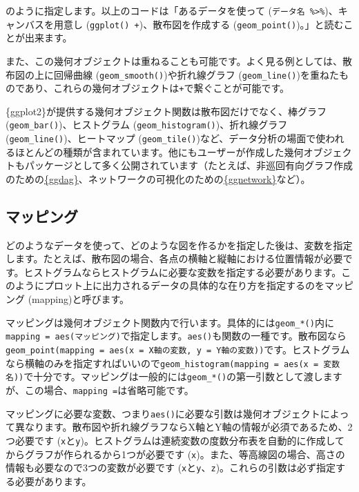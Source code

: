 \documentclass[
  a4paper,
  pandoc,
  ja=standard,
  jafont=haranoaji]{bxjsbook}
\begin{document}
のように指定します。以上のコードは「あるデータを使って
(\texttt{データ名\ \%\textgreater{}\%})、キャンバスを用意し
(\texttt{ggplot()\ +})、散布図を作成する
(\texttt{geom\_point()})。」と読むことが出来ます。

また、この幾何オブジェクトは重ねることも可能です。よく見る例としては、散布図の上に回帰曲線
(\texttt{geom\_smooth()})や折れ線グラフ
(\texttt{geom\_line()})を重ねたものであり、これらの幾何オブジェクトは\texttt{+}で繋ぐことが可能です。

\{ggplot2\}が提供する幾何オブジェクト関数は散布図だけでなく、棒グラフ
(\texttt{geom\_bar()})、ヒストグラム
(\texttt{geom\_histogram()})、折れ線グラフ
(\texttt{geom\_line()})、ヒートマップ
(\texttt{geom\_tile()})など、データ分析の場面で使われるほとんどの種類が含まれています。他にもユーザーが作成した幾何オブジェクトもパッケージとして多く公開されています（たとえば、非巡回有向グラフ作成のための\href{https://cran.r-project.org/web/packages/ggdag/index.html}{\{ggdag\}}、ネットワークの可視化のための\href{https://cran.r-project.org/web/packages/ggnetwork/index.html}{\{ggnetwork\}}など）。

\hypertarget{ux30deux30c3ux30d4ux30f3ux30b0}{%
\subsection{マッピング}\label{ux30deux30c3ux30d4ux30f3ux30b0}}

どのようなデータを使って、どのような図を作るかを指定した後は、変数を指定します。たとえば、散布図の場合、各点の横軸と縦軸における位置情報が必要です。ヒストグラムならヒストグラムに必要な変数を指定する必要があります。このようにプロット上に出力されるデータの具体的な在り方を指定するのをマッピング
(mapping)と呼びます。

マッピングは幾何オブジェクト関数内で行います。具体的には\texttt{geom\_*()}内に\texttt{mapping\ =\ aes(マッピング)}で指定します。\texttt{aes()}も関数の一種です。散布図なら\texttt{geom\_point(mapping\ =\ aes(x\ =\ X軸の変数,\ y\ =\ Y軸の変数))}です。ヒストグラムなら横軸のみを指定すればいいので\texttt{geom\_histogram(mapping\ =\ aes(x\ =\ 変数名))}で十分です。マッピングは一般的には\texttt{geom\_*()}の第一引数として渡しますが、この場合、\texttt{mapping\ =}は省略可能です。

マッピングに必要な変数、つまり\texttt{aes()}に必要な引数は幾何オブジェクトによって異なります。散布図や折れ線グラフならX軸とY軸の情報が必須であるため、2つ必要です
(\texttt{x}と\texttt{y})。ヒストグラムは連続変数の度数分布表を自動的に作成してからグラフが作られるから1つが必要です
(\texttt{x})。また、等高線図の場合、高さの情報も必要なので3つの変数が必要です
(\texttt{x}と\texttt{y}、\texttt{z})。これらの引数は必ず指定する必要があります。
\end{document}
